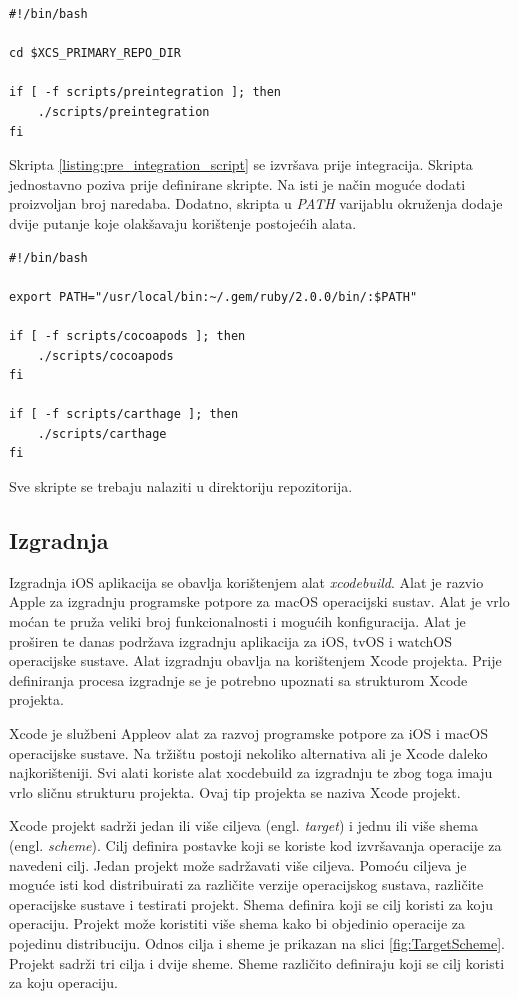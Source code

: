 \documentclass[times, utf8, diplomski, numeric]{fer}
\newcommand{\eng}[1]{(engl. \textit{#1})}
\begin{document}
\begin{lstlisting}[caption=Poziv skripte koja se izvršava prije integracije, label=listing:pre_integration_script_call]
#!/bin/bash

cd $XCS_PRIMARY_REPO_DIR

if [ -f scripts/preintegration ]; then
    ./scripts/preintegration
fi
\end{lstlisting}

Skripta \ref{listing:pre_integration_script} se izvršava prije integracija. Skripta jednostavno poziva prije definirane skripte. Na isti je način moguće dodati proizvoljan broj naredaba. Dodatno, skripta u \textit{PATH} varijablu okruženja dodaje dvije putanje koje olakšavaju korištenje postojećih alata.

\begin{lstlisting}[caption=Skripta koja se izvršava prije integracije, label=listing:pre_integration_script]
#!/bin/bash

export PATH="/usr/local/bin:~/.gem/ruby/2.0.0/bin/:$PATH"

if [ -f scripts/cocoapods ]; then
    ./scripts/cocoapods
fi

if [ -f scripts/carthage ]; then
    ./scripts/carthage
fi
\end{lstlisting}

Sve skripte se trebaju nalaziti u  direktoriju repozitorija.

\subsection{Izgradnja}

Izgradnja iOS aplikacija se obavlja korištenjem alat \textit{xcodebuild}\citep{xcodebuild}. Alat je razvio Apple za izgradnju programske potpore za macOS operacijski sustav. Alat je vrlo moćan te pruža veliki broj funkcionalnosti i mogućih konfiguracija. Alat je proširen te danas podržava izgradnju aplikacija za iOS, tvOS i watchOS operacijske sustave. Alat izgradnju obavlja na korištenjem Xcode projekta. Prije definiranja procesa izgradnje se je potrebno upoznati sa strukturom Xcode projekta.

Xcode je službeni Appleov alat za razvoj programske potpore za iOS i macOS operacijske sustave. Na tržištu postoji nekoliko alternativa ali je Xcode daleko najkorišteniji. Svi alati koriste alat xocdebuild za izgradnju te zbog toga imaju vrlo sličnu strukturu projekta. Ovaj tip projekta se naziva Xcode projekt.

Xcode projekt sadrži jedan ili više ciljeva \eng{target} i jednu ili više shema \eng{scheme}. Cilj definira postavke koji se koriste kod izvršavanja operacije za navedeni cilj.  Jedan projekt može sadržavati više ciljeva. Pomoću ciljeva je moguće isti kod distribuirati za različite verzije operacijskog sustava, različite operacijske sustave i testirati projekt. Shema definira koji se cilj koristi za koju operaciju. Projekt može koristiti više shema kako bi objedinio operacije za pojedinu distribuciju. Odnos cilja i sheme je prikazan na slici \ref{fig:TargetScheme}. Projekt sadrži tri cilja i dvije sheme. Sheme različito definiraju koji se cilj koristi za koju operaciju.
\end{document}
